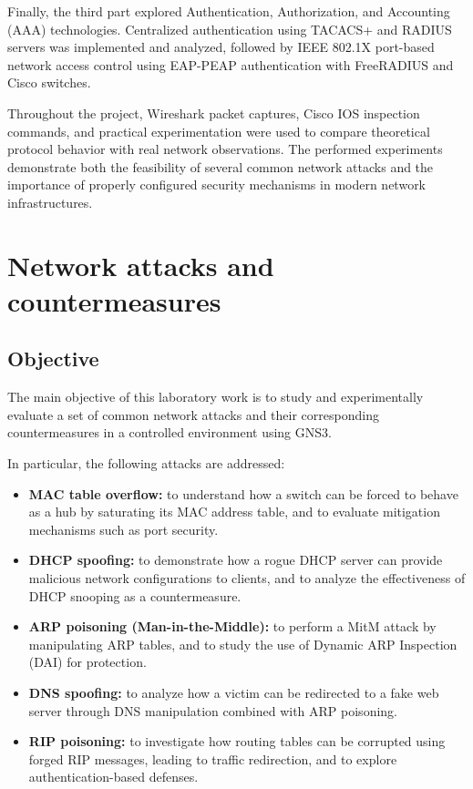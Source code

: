 \documentclass[12pt]{article}
\begin{document}
Finally, the third part explored Authentication, Authorization, and Accounting (AAA) technologies. Centralized authentication using TACACS+ and RADIUS servers was implemented and analyzed, followed by IEEE 802.1X port-based network access control using EAP-PEAP authentication with FreeRADIUS and Cisco switches.

Throughout the project, Wireshark packet captures, Cisco IOS inspection commands, and practical experimentation were used to compare theoretical protocol behavior with real network observations. The performed experiments demonstrate both the feasibility of several common network attacks and the importance of properly configured security mechanisms in modern network infrastructures.

\newpage

\section{Network attacks and countermeasures}

\subsection{Objective}

The main objective of this laboratory work is to study and experimentally evaluate a set of common network attacks and their corresponding countermeasures in a controlled environment using GNS3.

In particular, the following attacks are addressed:

\begin{itemize}
    \item \textbf{MAC table overflow:} to understand how a switch can be forced to behave as a hub by saturating its MAC address table, and to evaluate mitigation mechanisms such as port security.
    
    \item \textbf{DHCP spoofing:} to demonstrate how a rogue DHCP server can provide malicious network configurations to clients, and to analyze the effectiveness of DHCP snooping as a countermeasure.
    
    \item \textbf{ARP poisoning (Man-in-the-Middle):} to perform a MitM attack by manipulating ARP tables, and to study the use of Dynamic ARP Inspection (DAI) for protection.
    
    \item \textbf{DNS spoofing:} to analyze how a victim can be redirected to a fake web server through DNS manipulation combined with ARP poisoning.
    
    \item \textbf{RIP poisoning:} to investigate how routing tables can be corrupted using forged RIP messages, leading to traffic redirection, and to explore authentication-based defenses.
\end{itemize}
\end{document}
